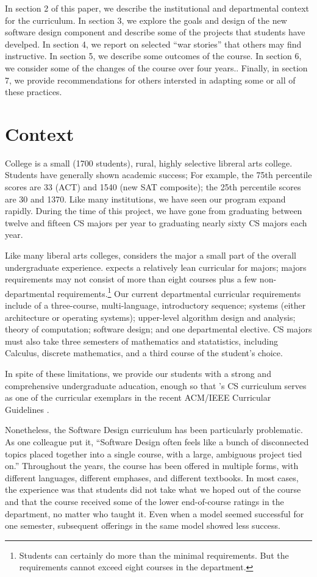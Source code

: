 In section 2 of this paper, we describe the institutional and
departmental context for the curriculum.  In section 3, we explore
the goals and design of the new software design component and
describe some of the projects that students have develped.  In
section 4, we report on selected ``war stories'' that others may
find instructive.  In section 5, we describe some outcomes of the
course.  In section 6, we consider some of the changes of the course
over four years..  Finally, in section 7, we provide recommendations
for others intersted in adapting some or all of these practices.

\section{Context}

\college College is a small (1700 students), rural, highly selective
libreral arts college.  Students have generally shown academic
success; For example, the 75th percentile scores are 33 (ACT) and
1540 (new SAT composite); the 25th percentile scores are 30 and
1370.  Like many institutions, we have seen our program expand
rapidly.  During the time of this project, we have gone from
graduating between twelve and fifteen CS majors per year to graduating
nearly sixty CS majors each year.

Like many liberal arts colleges, \college considers the major a
small part of the overall undergraduate experience.  \college expects
a relatively lean curricular for majors; majors requirements may
not consist of more than eight courses plus a few non-departmental
requirements.\footnote{Students can certainly do more than the
minimal requirements.  But the requirements cannot exceed eight
courses in the department.} Our current departmental curricular
requirements include of a three-course, multi-language, introductory
sequence; systems (either architecture or operating systems);
upper-level algorithm design and analysis; theory of computation;
software design; and one departmental elective.  CS majors must
also take three semesters of mathematics and statatistics, including
Calculus, discrete mathematics, and a third course of the student's
choice.  

In spite of these limitations, we provide our students with a strong
and comprehensive undergraduate aducation, enough so that \college's
CS curriculum serves as one of the curricular exemplars in the
recent ACM/IEEE Curricular Guidelines \cite{curriclum-2013}.

Nonetheless, the Software Design curriculum has been particularly
problematic.  As one colleague put it, ``Software Design often feels
like a bunch of disconnected topics placed together into a single
course, with a large, ambiguous project tied on.''  Throughout the
years, the course has been offered in multiple forms, with different
languages, different emphases, and different textbooks.  In most
cases, the experience was that students did not take what we hoped
out of the course and that the course received some of the lower
end-of-course ratings in the department, no matter who taught it.
Even when a model seemed successful for one semester, subsequent
offerings in the same model showed less success.

